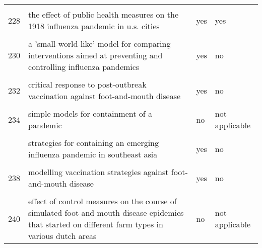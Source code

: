 \documentclass[
]{article}
\begin{document}
\begin{landscape}
\begin{longtable}{l>{\raggedright\arraybackslash}p{9cm}ll}
\cellcolor{gray!6}{227} & \cellcolor{gray!6}{stochastic model of an influenza epidemic with drug resistance} & \cellcolor{gray!6}{no} & \cellcolor{gray!6}{not applicable}\\
228 & the effect of public health measures on the 1918 influenza pandemic in u.s. cities & yes & yes\\
\cellcolor{gray!6}{229} & \cellcolor{gray!6}{vaccinating in disease-free regions: a vaccine model with application to yellow fever} & \cellcolor{gray!6}{no} & \cellcolor{gray!6}{not applicable}\\
230 & a 'small-world-like' model for comparing interventions aimed at preventing and controlling influenza pandemics & yes & no\\
\addlinespace
\cellcolor{gray!6}{231} & \cellcolor{gray!6}{containing pandemic influenza with antiviral agents: analytical commentary} & \cellcolor{gray!6}{no} & \cellcolor{gray!6}{not applicable}\\
232 & critical response to post-outbreak vaccination against foot-and-mouth disease & yes & no\\
\cellcolor{gray!6}{233} & \cellcolor{gray!6}{mitigation strategies for pandemic influenza in the united states} & \cellcolor{gray!6}{yes} & \cellcolor{gray!6}{yes}\\
234 & simple models for containment of a pandemic & no & not applicable\\
\cellcolor{gray!6}{235} & \cellcolor{gray!6}{statistical inference in a stochastic epidemic seir model with control intervention: ebola as a case study} & \cellcolor{gray!6}{yes} & \cellcolor{gray!6}{no}\\
\addlinespace
236 & strategies for containing an emerging influenza pandemic in southeast asia & yes & no\\
\cellcolor{gray!6}{237} & \cellcolor{gray!6}{modeling alternative mitigation strategies for a hypothetical outbreak of foot-and-mouth disease in the united states} & \cellcolor{gray!6}{no} & \cellcolor{gray!6}{not applicable}\\
238 & modelling vaccination strategies against foot-and-mouth disease & yes & no\\
\cellcolor{gray!6}{239} & \cellcolor{gray!6}{a decision-tree to optimise control measures during the early stage of a foot-and-mouth disease epidemic} & \cellcolor{gray!6}{no} & \cellcolor{gray!6}{not applicable}\\
240 & effect of control measures on the course of simulated foot and mouth disease epidemics that started on different farm types in various dutch areas & no & not applicable\\

\end{longtable}
\end{landscape}
\end{document}
